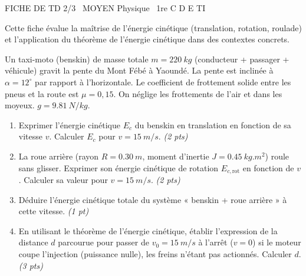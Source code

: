 \documentclass[11pt]{article}
\begin{document}
\begin{tcolorbox}[enhanced,colback=popink,colframe=popink,arc=10pt,boxrule=0pt,left=12pt,right=12pt,top=9pt,bottom=9pt]
{\color{white}\popxbold\small FICHE DE TD 2/3 \textbullet\ MOYEN \hfill Physique \textbullet\ 1re C D E TI\par}
\end{tcolorbox}
\vspace{4pt}
Cette fiche évalue la maîtrise de l'énergie cinétique (translation, rotation, roulade) et l'application du théorème de l'énergie cinétique dans des contextes concrets.

\begin{exercice}
Un taxi-moto (benskin) de masse totale $m = \SI{220}{kg}$ (conducteur + passager + véhicule) gravit la pente du Mont Fébé à Yaoundé. La pente est inclinée à $\alpha = 12^{\circ}$ par rapport à l'horizontale. Le coefficient de frottement solide entre les pneus et la route est $\mu = 0,15$. On néglige les frottements de l'air et dans les moyeux. $g = \SI{9,81}{N/kg}$.
\begin{enumerate}
    \item Exprimer l'énergie cinétique $E_c$ du benskin en translation en fonction de sa vitesse $v$. Calculer $E_c$ pour $v = \SI{15}{m/s}$. \textit{(2 pts)}
    \item La roue arrière (rayon $R = \SI{0,30}{m}$, moment d'inertie $J = \SI{0,45}{kg.m^2}$) roule sans glisser. Exprimer son énergie cinétique de rotation $E_{c,\text{rot}}$ en fonction de $v$. Calculer sa valeur pour $v = \SI{15}{m/s}$. \textit{(2 pts)}
    \item Déduire l'énergie cinétique totale du système « benskin + roue arrière » à cette vitesse. \textit{(1 pt)}
    \item En utilisant le théorème de l'énergie cinétique, établir l'expression de la distance $d$ parcourue pour passer de $v_0 = \SI{15}{m/s}$ à l'arrêt ($v=0$) si le moteur coupe l'injection (puissance nulle), les freins n'étant pas actionnés. Calculer $d$. \textit{(3 pts)}
\end{enumerate}
\end{exercice}
\end{document}
